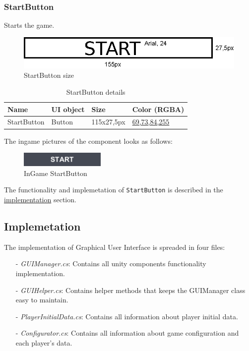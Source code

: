 \subsubsection{StartButton}\label{gui-startbutton}
\noindent Starts the game.

\begin{figure}[h!]\centering
	\hspace*{.75cm}\includegraphics[scale=1]{gui-imgs/startbutton-size}
	\caption{StartButton size}
\end{figure}

\begin{table}[h!]\centering
	\caption{StartButton details}
	\begin{tabular}{|C{4cm}|C{4cm}|C{4cm}|C{4cm}|}
		\hline
		\textbf{Name} & \textbf{UI object} & \textbf{Size} & \textbf{Color (RGBA)} \\\hline
		StartButton & Button & 115x27,5px & \hyperref[gui-colors]{69,73,84,255} \\\hline
	\end{tabular}
\end{table}

\noindent The ingame pictures of the component looks as follows:

\begin{figure}[h!]
	\centering
	\includegraphics[scale=1, frame]{gui-imgs/startbutton}
	\caption{InGame StartButton}
\end{figure}

\noindent The functionality and implemetation of \verb|StartButton| is described in the \hyperref[gui-implementation]{implementation} section.

\subsection{Implemetation}\label{gui-implementation}
\noindent The implementation of Graphical User Interface is spreaded in four files:

\begin{itemize}
	\item[-] \textit{GUIManager.cs}: Contains all unity components functionality implementation.
	\item[-] \textit{GUIHelper.cs}: Contains helper methods that keeps the GUIManager class easy to maintain.
	\item[-] \textit{PlayerInitialData.cs}: Contains all information about player initial data.
	\item[-] \textit{Configurator.cs}: Contains all information about game configuration and each player's data.
\end{itemize}

